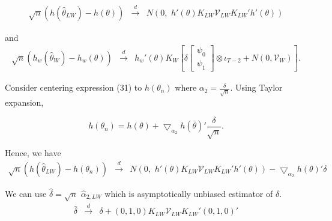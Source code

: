 	\begin{eqnarray}
 			\sqrt{n} (h(\widehat{\theta}_{LW})-h(\theta)) &\overset{d}{\rightarrow}&  			N\left(0,\,\, h'(\theta)K_{LW}\mathcal{V}_{LW}K_{LW}'h'(\theta) \right)
	\end{eqnarray}
	
	
and
\begin{eqnarray}
 	\sqrt{n}(h_w(\widehat{\theta}_{W})-h_w(\theta)) &\overset{d}{\rightarrow}&
 h_w'(\theta)	K_W  \left[\delta \left[\begin{array}{l} \psi_0\\ 
\psi_1 \end{array}\right]  \otimes \iota_{T-2} + N\left(0, \mathcal{V}_W\right) \right].
	\end{eqnarray}

	
	Consider centering expression (31) to $h(\theta_n)$ where $\alpha_2 = \frac{\delta}{\sqrt{n}}$. Using Taylor expansion,
	
	\[
h(\theta_n) = h(\theta) + \bigtriangledown_{\alpha_2} h(\bar{\theta})'\frac{\delta}{\sqrt{n}}.		
	\]	
	
	Hence, we have
	\begin{eqnarray}
 			\sqrt{n} (h(\widehat{\theta}_{LW})-h(\theta_n)) &\overset{d}{\rightarrow}&  			N\left(0,\,\, h'(\theta)K_{LW}\mathcal{V}_{LW}K_{LW}'h'(\theta) \right) -\bigtriangledown_{\alpha_2} h(\theta)'\delta 
	\end{eqnarray}
	
	We can use $\widehat{\delta} = \sqrt{n}\,\, \widehat{\alpha}_{2, LW}$ which is asymptotically unbiased estimator of $\delta$.	
\begin{eqnarray}
 			\widehat{\delta} &\overset{d}{\rightarrow}& \delta + (0, 1, 0)K_{LW} \mathcal{V}_{LW} K_{LW}'(0, 1, 0)'	  			
	\end{eqnarray}	
	

